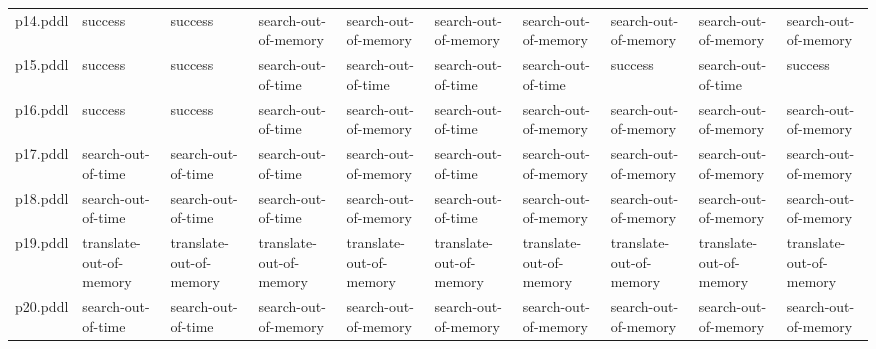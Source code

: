 \documentclass{article}
\begin{document}
\begin{tabular}{@{}lrrrrrrrrr@{}}
p14.pddl & \multicolumn{1}{|l|}{success} & \multicolumn{1}{|l|}{success} & \multicolumn{1}{|l|}{search-out-of-memory} & \multicolumn{1}{|l|}{search-out-of-memory} & \multicolumn{1}{|l|}{search-out-of-memory} & \multicolumn{1}{|l|}{search-out-of-memory} & \multicolumn{1}{|l|}{search-out-of-memory} & \multicolumn{1}{|l|}{search-out-of-memory} & \multicolumn{1}{|l|}{search-out-of-memory} \\
p15.pddl & \multicolumn{1}{|l|}{success} & \multicolumn{1}{|l|}{success} & \multicolumn{1}{|l|}{search-out-of-time} & \multicolumn{1}{|l|}{search-out-of-time} & \multicolumn{1}{|l|}{search-out-of-time} & \multicolumn{1}{|l|}{search-out-of-time} & \multicolumn{1}{|l|}{success} & \multicolumn{1}{|l|}{search-out-of-time} & \multicolumn{1}{|l|}{success} \\
p16.pddl & \multicolumn{1}{|l|}{success} & \multicolumn{1}{|l|}{success} & \multicolumn{1}{|l|}{search-out-of-time} & \multicolumn{1}{|l|}{search-out-of-memory} & \multicolumn{1}{|l|}{search-out-of-time} & \multicolumn{1}{|l|}{search-out-of-memory} & \multicolumn{1}{|l|}{search-out-of-memory} & \multicolumn{1}{|l|}{search-out-of-memory} & \multicolumn{1}{|l|}{search-out-of-memory} \\
p17.pddl & \multicolumn{1}{|l|}{search-out-of-time} & \multicolumn{1}{|l|}{search-out-of-time} & \multicolumn{1}{|l|}{search-out-of-time} & \multicolumn{1}{|l|}{search-out-of-memory} & \multicolumn{1}{|l|}{search-out-of-time} & \multicolumn{1}{|l|}{search-out-of-memory} & \multicolumn{1}{|l|}{search-out-of-memory} & \multicolumn{1}{|l|}{search-out-of-memory} & \multicolumn{1}{|l|}{search-out-of-memory} \\
p18.pddl & \multicolumn{1}{|l|}{search-out-of-time} & \multicolumn{1}{|l|}{search-out-of-time} & \multicolumn{1}{|l|}{search-out-of-time} & \multicolumn{1}{|l|}{search-out-of-memory} & \multicolumn{1}{|l|}{search-out-of-time} & \multicolumn{1}{|l|}{search-out-of-memory} & \multicolumn{1}{|l|}{search-out-of-memory} & \multicolumn{1}{|l|}{search-out-of-memory} & \multicolumn{1}{|l|}{search-out-of-memory} \\
p19.pddl & \multicolumn{1}{|l|}{translate-out-of-memory} & \multicolumn{1}{|l|}{translate-out-of-memory} & \multicolumn{1}{|l|}{translate-out-of-memory} & \multicolumn{1}{|l|}{translate-out-of-memory} & \multicolumn{1}{|l|}{translate-out-of-memory} & \multicolumn{1}{|l|}{translate-out-of-memory} & \multicolumn{1}{|l|}{translate-out-of-memory} & \multicolumn{1}{|l|}{translate-out-of-memory} & \multicolumn{1}{|l|}{translate-out-of-memory} \\
p20.pddl & \multicolumn{1}{|l|}{search-out-of-time} & \multicolumn{1}{|l|}{search-out-of-time} & \multicolumn{1}{|l|}{search-out-of-memory} & \multicolumn{1}{|l|}{search-out-of-memory} & \multicolumn{1}{|l|}{search-out-of-memory} & \multicolumn{1}{|l|}{search-out-of-memory} & \multicolumn{1}{|l|}{search-out-of-memory} & \multicolumn{1}{|l|}{search-out-of-memory} & \multicolumn{1}{|l|}{search-out-of-memory} \\
\end{tabular}
\end{document}
